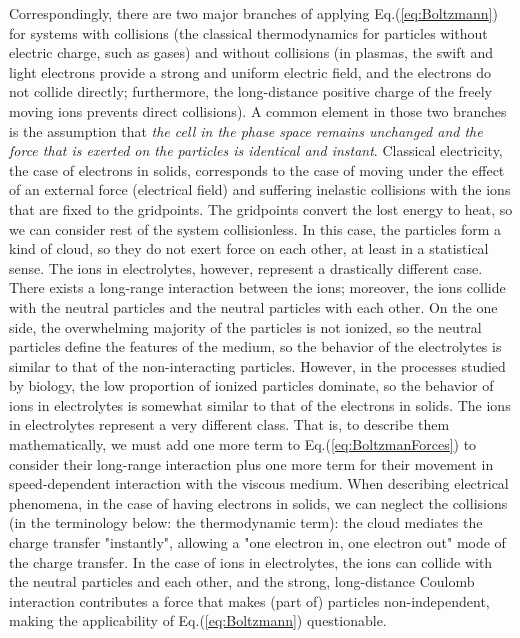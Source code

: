 Correspondingly, there are two major branches of applying Eq.(\ref{eq:Boltzmann}) 
for systems with collisions (the classical thermodynamics for particles
without electric charge, such as gases) and without collisions (in plasmas, the swift and light electrons provide a strong and uniform electric field, and the electrons do not collide directly; furthermore, the long-distance positive charge of the freely moving ions prevents direct collisions).
 A common element in those two branches is the assumption that \textit{the cell
	in the phase space remains unchanged and the force that is exerted 
	on the particles is identical and instant}.
Classical electricity, the case of electrons in solids, corresponds to the case
of moving under the effect of an external force (electrical field)
and suffering inelastic collisions with the ions that are fixed to the 
gridpoints. The gridpoints convert the lost energy to heat,  so we can consider rest of the system collisionless.
In this case, the particles form a kind of cloud, so they do not exert
force on each other, at least in a statistical sense. The ions in electrolytes, however, represent a drastically different case. There exists a 
long-range interaction between the ions; moreover, the ions collide
with the neutral particles and the neutral particles with each other. On the one side, the overwhelming majority of the particles is not ionized, so the neutral particles define the features of the medium,
so the behavior of the electrolytes is similar to that of the 
non-interacting particles. However, in the processes studied by
biology, the low proportion of ionized particles dominate,
so the behavior of ions in electrolytes is somewhat similar
to that of the electrons in solids.
 The ions in electrolytes represent a 
very different class.
That is, to describe them mathematically,
we must add one more term to Eq.(\ref{eq:BoltzmanForces}) to consider
their long-range interaction plus one more term for their movement in speed-dependent interaction with the viscous medium. When describing electrical phenomena, 
in the case of having electrons in solids, we can neglect the  
collisions (in the terminology below: the thermodynamic term):
the cloud mediates the charge transfer "instantly", allowing a "one electron in, one electron out" mode of the charge transfer.
In the case of ions in electrolytes,
the ions can collide with the neutral particles and each other, and the 
strong, long-distance Coulomb interaction contributes
a force that makes (part of) particles non-independent,
making the applicability of Eq.(\ref{eq:Boltzmann}) questionable.



